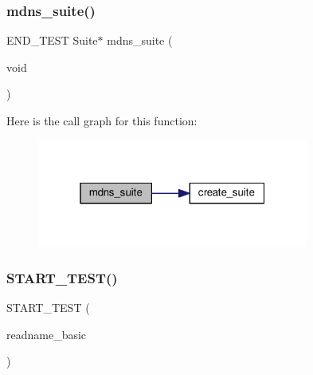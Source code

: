 \subsubsection{\texorpdfstring{mdns\+\_\+suite()}{mdns\_suite()}}
{\footnotesize\ttfamily E\+N\+D\+\_\+\+T\+E\+ST Suite$\ast$ mdns\+\_\+suite (\begin{DoxyParamCaption}\item[{void}]{ }\end{DoxyParamCaption})}

Here is the call graph for this function\+:
\nopagebreak
\begin{figure}[H]
\begin{center}
\leavevmode
\includegraphics[width=253pt]{openmote-cc2538_2lwip_2test_2unit_2mdns_2test__mdns_8c_aa4b6bb1fde82b8d3df03023d84f8fe6c_cgraph}
\end{center}
\end{figure}
\mbox{\label{openmote-cc2538_2lwip_2test_2unit_2mdns_2test__mdns_8c_ab52139910d70bc28c091be6bae6bd464}} 
\subsubsection{\texorpdfstring{S\+T\+A\+R\+T\+\_\+\+T\+E\+S\+T()}{START\_TEST()}\hspace{0.1cm}{\footnotesize\ttfamily [1/29]}}
{\footnotesize\ttfamily S\+T\+A\+R\+T\+\_\+\+T\+E\+ST (\begin{DoxyParamCaption}\item[{readname\+\_\+basic}]{ }\end{DoxyParamCaption})}

